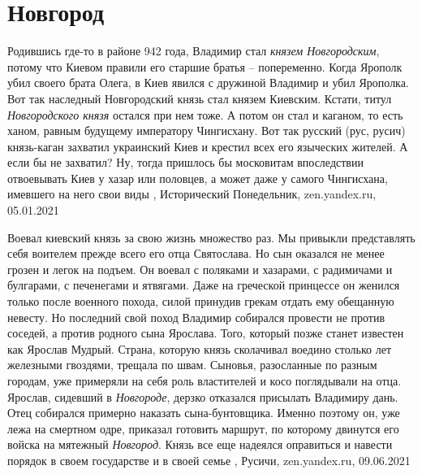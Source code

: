 
 
 
 
 
\chapter{Новгород}

Родившись где-то в районе 942 года, Владимир стал \emph{князем Новгородским}, потому
что Киевом правили его старшие братья – попеременно. Когда Ярополк убил своего
брата Олега, в Киев явился с дружиной Владимир и убил Ярополка. Вот так
наследный Новгородский князь стал князем Киевским. Кстати, титул \emph{Новгородского
князя} остался при нем тоже. А потом он стал и каганом, то есть ханом, равным
будущему императору Чингисхану.  Вот так русский (рус, русич) князь-каган
захватил украинский Киев и крестил всех его языческих жителей. А если бы не
захватил?  Ну, тогда пришлось бы московитам впоследствии отвоевывать Киев у
хазар или половцев, а может даже у самого Чингисхана, имевшего на него свои
виды
,
Исторический Понедельник, zen.yandex.ru, 05.01.2021 

Воевал киевский князь за свою жизнь множество раз. Мы привыкли представлять
себя воителем прежде всего его отца Святослава. Но сын оказался не менее грозен
и легок на подъем. Он воевал с поляками и хазарами, с радимичами и булгарами, с
печенегами и ятвягами. Даже на греческой принцессе он женился только после
военного похода, силой принудив грекам отдать ему обещанную невесту.  Но
последний свой поход Владимир собирался провести не против соседей, а против
родного сына Ярослава. Того, который позже станет известен как Ярослав Мудрый.
Страна, которую князь сколачивал воедино столько лет железными гвоздями,
трещала по швам. Сыновья, разосланные по разным городам, уже примеряли на себя
роль властителей и косо поглядывали на отца. Ярослав, сидевший в
\emph{Новгороде}, дерзко отказался присылать Владимиру дань.  Отец собирался
примерно наказать сына-бунтовщика. Именно поэтому он, уже лежа на смертном
одре, приказал готовить маршрут, по которому двинутся его войска на мятежный
\emph{Новгород}. Князь все еще надеялся оправиться и навести порядок в своем
государстве и в своей семье
, 
Русичи, zen.yandex.ru, 09.06.2021
